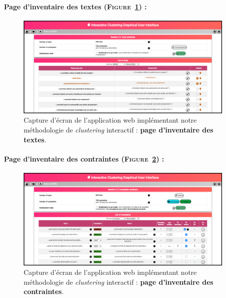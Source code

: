 	
	\newpage
	\paragraph{Page d'inventaire des textes (\textsc{Figure~\ref{figure:C-WEB-APPLICATION-INVENTAIRE-TEXTES}}) :}
	
		\begin{figure}[H]
			\centering
			\includegraphics[width=0.95\textwidth]{figures/interactive-clustering-application-textes}
			\caption{
				Capture d'écran de l'application web implémentant notre méthodologie de \textit{clustering} interactif : \textbf{page d'inventaire des textes}.
			}
			\label{figure:C-WEB-APPLICATION-INVENTAIRE-TEXTES}
		\end{figure}
	
	
	\newpage
	\paragraph{Page d'inventaire des contraintes (\textsc{Figure~\ref{figure:C-WEB-APPLICATION-INVENTAIRE-CONTRAINTES}}) :}
	
		\begin{figure}[H]
			\centering
			\includegraphics[width=0.95\textwidth]{figures/interactive-clustering-application-contraintes}
			\caption{
				Capture d'écran de l'application web implémentant notre méthodologie de \textit{clustering} interactif : \textbf{page d'inventaire des contraintes}.
			}
			\label{figure:C-WEB-APPLICATION-INVENTAIRE-CONTRAINTES}
		\end{figure}
	
